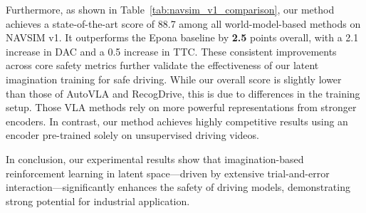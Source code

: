 \documentclass[runningheads]{llncs}
\begin{document}
Furthermore, as shown in Table~\ref{tab:navsim_v1_comparison}, our method achieves a state-of-the-art score of 88.7 among all world-model-based methods on NAVSIM v1. It outperforms the Epona baseline by \textbf{2.5} points overall, with a 2.1 increase in DAC and a 0.5 increase in TTC. These consistent improvements across core safety metrics further validate the effectiveness of our latent imagination training for safe driving. While our overall score is slightly lower than those of AutoVLA and RecogDrive, this is due to differences in the training setup. Those VLA methods rely on more powerful representations from stronger encoders. In contrast, our method achieves highly competitive results using an encoder pre-trained solely on unsupervised driving videos.

In conclusion, our experimental results show that imagination-based reinforcement learning in latent space—driven by extensive trial-and-error interaction—significantly enhances the safety of driving models, demonstrating strong potential for industrial application.
\end{document}
